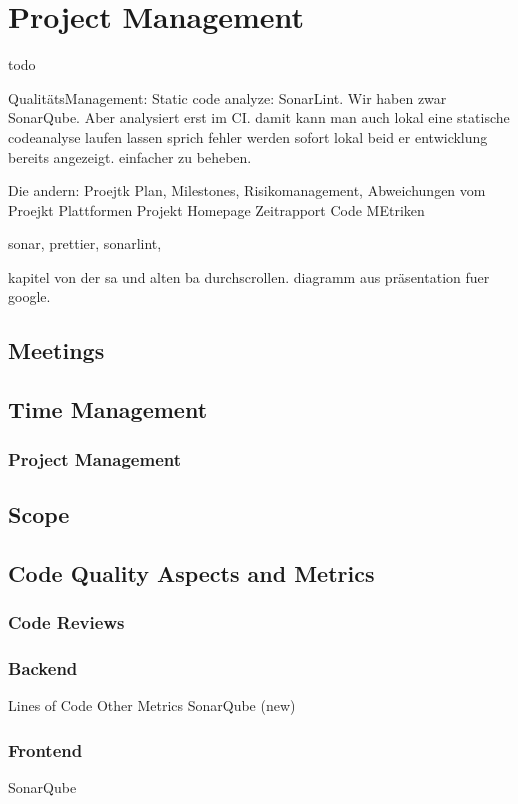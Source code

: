 \section{Project Management}
\label{section:project_management}


todo

QualitätsManagement: Static code analyze: SonarLint. \cite{sonar-lint}
Wir haben zwar SonarQube. Aber analysiert erst im CI.
damit kann man auch lokal eine statische codeanalyse laufen lassen sprich fehler werden sofort lokal beid er
entwicklung bereits angezeigt. einfacher zu beheben.


Die andern:
Proejtk Plan, Milestones, Risikomanagement, Abweichungen vom Proejkt Plattformen
Projekt Homepage
Zeitrapport
Code MEtriken



sonar, prettier, sonarlint,

kapitel von der sa und alten ba durchscrollen.
diagramm aus präsentation fuer google.


\subsection{Meetings}
\subsection{Time Management}
\subsubsection{Project Management}
\subsection{Scope}
\subsection{Code Quality Aspects and Metrics}
\subsubsection{Code Reviews}
\subsubsection{Backend}
Lines of Code
Other Metrics
SonarQube (new)
\subsubsection{Frontend}
SonarQube

